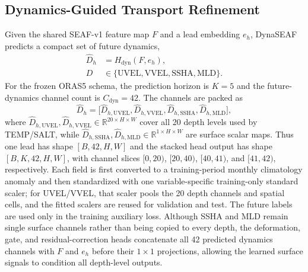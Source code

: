 \documentclass[conference]{IEEEtran}
\begin{document}
\subsection{Dynamics-Guided Transport Refinement}
Given the shared SEAF-v1 feature map $F$ and a lead embedding $e_h$, DynaSEAF predicts a compact set of future dynamics,
\begin{equation}
\begin{aligned}
\widehat{D}_h&=H_{\mathrm{dyn}}(F,e_h),\\[-1pt]
D&\in\{\mathrm{UVEL},\mathrm{VVEL},\mathrm{SSHA},\mathrm{MLD}\}.
\end{aligned}
\label{eq:dynaseaf_dynamics}
\end{equation}
For the frozen ORAS5 schema, the prediction horizon is $K=5$ and the future-dynamics channel count is $C_{\mathrm{dyn}}=42$. The channels are packed as
\begin{equation}
\widehat{D}_h=\big[\widehat{D}_{h,\mathrm{UVEL}},\widehat{D}_{h,\mathrm{VVEL}},
\widehat{D}_{h,\mathrm{SSHA}},\widehat{D}_{h,\mathrm{MLD}}\big],
\end{equation}
where $\widehat{D}_{h,\mathrm{UVEL}},\widehat{D}_{h,\mathrm{VVEL}}\in\mathbb{R}^{20\times H\times W}$ cover all 20 depth levels used by TEMP/SALT, while $\widehat{D}_{h,\mathrm{SSHA}},\widehat{D}_{h,\mathrm{MLD}}\in\mathbb{R}^{1\times H\times W}$ are surface scalar maps. Thus one lead has shape $[B,42,H,W]$ and the stacked head output has shape $[B,K,42,H,W]$, with channel slices $[0,20)$, $[20,40)$, $[40,41)$, and $[41,42)$, respectively. Each field is first converted to a training-period monthly climatology anomaly and then standardized with one variable-specific training-only standard scaler; for UVEL/VVEL, that scaler pools the 20 depth channels and spatial cells, and the fitted scalers are reused for validation and test. The future labels are used only in the training auxiliary loss. Although SSHA and MLD remain single surface channels rather than being copied to every depth, the deformation, gate, and residual-correction heads concatenate all 42 predicted dynamics channels with $F$ and $e_h$ before their $1\times1$ projections, allowing the learned surface signals to condition all depth-level outputs.
\end{document}
